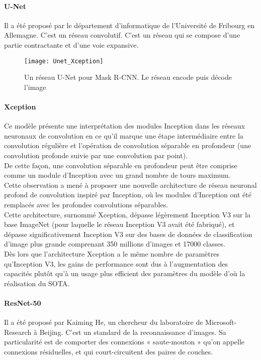 \documentclass[
10pt, %
a4paper, %
oneside, %
headinclude,footinclude, %
]{scrartcl}
\begin{document}
\paragraph{U-Net}
Il a été proposé par le département d’informatique de l’Université de Fribourg en Allemagne. C’est un réseau convolutif. C’est un réseau qui se compose d’une partie contractante et d’une voie expansive.
\begin{figure}[htb]
\centering 
\texttt{[image: Unet\_Xception]} 
\caption[U-Net]{Un réseau U-Net pour Mask R-CNN. Le réseau encode puis décode l’image} %
\label{fig:Unet_Xception} 
\end{figure}
\paragraph{Xception}
Ce modèle présente une interprétation des modules Inception dans les réseaux neuronaux de convolution en ce qu’il marque une étape intermédiaire entre la convolution régulière et l’opération de convolution séparable en profondeur\cite{cho2017xception} (une convolution profonde suivie par une convolution par point).\\
De cette façon, une convolution séparable en profondeur peut être comprise comme un module d’Inception avec un grand nombre de tours maximum.
\\
Cette observation a mené à proposer une nouvelle architecture de réseau neuronal profond de convolution inspiré par Inception, où les modules d’Inception ont été remplacés avec les profondes convolutions séparables.
\\
Cette architecture, surnommé Xception, dépasse légèrement Inception V3 sur la base ImageNet (pour laquelle le réseau Inception V3 avait été fabriqué), et dépasse significativement Inception V3 sur des bases de données de classification d’image plus grande comprenant 350 millions d’images et 17000 classes.
\\
Dès lors que l’architecture Xception a le même nombre de paramètres qu’Inception V3, les gains de performance sont dus à l’augmentation des capacités plutôt qu’à un usage plus efficient des paramètres du modèle d’où la réalisation du SOTA.

\paragraph{ResNet-50}
Il a été proposé par Kaiming He, un chercheur du laboratoire de Microsoft-Research à Beijing. C’est un standard de la reconnaissance d’images. Sa particularité est de comporter des connexions « saute-mouton »  qu’on appelle connexions résiduelles\cite{LeCun_2019_qlma}, et qui court-circuitent des paires de couches.
 
\end{document}
